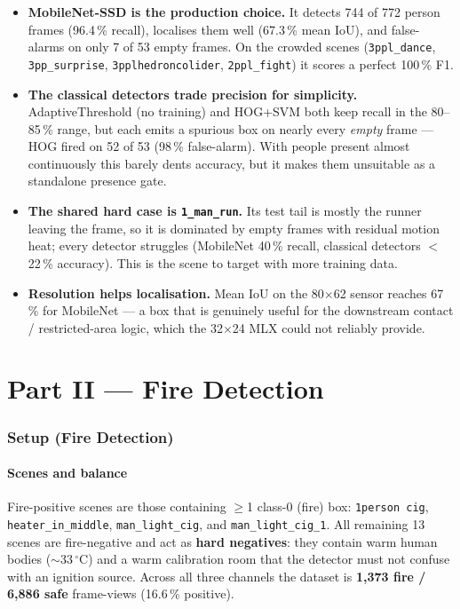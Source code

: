 \documentclass[11pt, a4paper]{article}
\begin{document}
\begin{itemize}[leftmargin=2em]
    \item \textbf{MobileNet-SSD is the production choice.} It detects 744 of 772
        person frames (96.4\,\% recall), localises them well (67.3\,\% mean IoU),
        and false-alarms on only 7 of 53 empty frames. On the crowded scenes
        (\texttt{3ppl\_dance}, \texttt{3pp\_surprise}, \texttt{3pplhedroncolider},
        \texttt{2ppl\_fight}) it scores a perfect 100\,\% F1.
    \item \textbf{The classical detectors trade precision for simplicity.}
        AdaptiveThreshold (no training) and HOG+SVM both keep recall in the
        80--85\,\% range, but each emits a spurious box on nearly every
        \emph{empty} frame --- HOG fired on 52 of 53 (98\,\% false-alarm). With
        people present almost continuously this barely dents accuracy, but it
        makes them unsuitable as a standalone presence gate.
    \item \textbf{The shared hard case is \texttt{1\_man\_run}.} Its test tail is
        mostly the runner leaving the frame, so it is dominated by empty frames
        with residual motion heat; every detector struggles (MobileNet 40\,\%
        recall, classical detectors $<$\,22\,\% accuracy). This is the scene to
        target with more training data.
    \item \textbf{Resolution helps localisation.} Mean IoU on the 80$\times$62
        sensor reaches 67\,\% for MobileNet --- a box that is genuinely useful for
        the downstream contact / restricted-area logic, which the 32$\times$24
        MLX could not reliably provide.
\end{itemize}

\part*{Part II — Fire Detection}

\section{Setup (Fire Detection)}

\subsection{Scenes and balance}
Fire-positive scenes are those containing $\ge$1 class-0 (fire) box:
\texttt{1person cig}, \texttt{heater\_in\_middle}, \texttt{man\_light\_cig}, and
\texttt{man\_light\_cig\_1}. All remaining 13 scenes are fire-negative and act as
\textbf{hard negatives}: they contain warm human bodies ($\sim$33\,$^\circ$C) and
a warm calibration room that the detector must not confuse with an ignition
source. Across all three channels the dataset is
\textbf{1{,}373 fire / 6{,}886 safe} frame-views (16.6\,\% positive).
\end{document}
